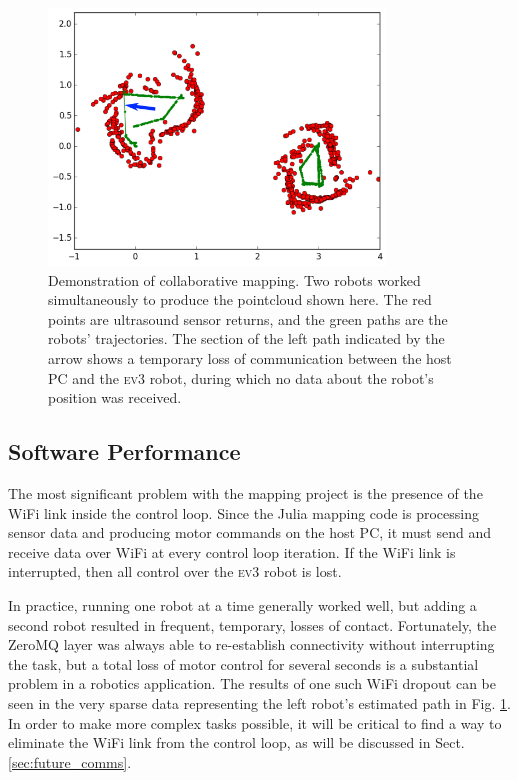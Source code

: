 \documentclass[]{article}
\newcommand{\ev}{\textsc{ev3}}
\begin{document}
\begin{figure}[htbp!]
    \centering
    \includegraphics[width=0.8\textwidth]{fig/N9_map_A_C.png}
    \caption{Demonstration of collaborative mapping. Two robots worked simultaneously to produce the pointcloud shown here. The red points are ultrasound sensor returns, and the green paths are the robots' trajectories. The section of the left path indicated by the arrow shows a temporary loss of communication between the host PC and the \ev{} robot, during which no data about the robot's position was received.}
    \label{fig:parallel_map}
\end{figure}

\subsection{Software Performance}
\label{sec:software_performance}

The most significant problem with the mapping project is the presence of the WiFi link inside the control loop. Since the Julia mapping code is processing sensor data and producing motor commands on the host PC, it must send and receive data over WiFi at every control loop iteration. If the WiFi link is interrupted, then all control over the \ev{} robot is lost. 

In practice, running one robot at a time generally worked well, but adding a second robot resulted in frequent, temporary, losses of contact. Fortunately, the ZeroMQ layer was always able to re-establish connectivity without interrupting the task, but a total loss of motor control for several seconds is a substantial problem in a robotics application. The results of one such WiFi dropout can be seen in the very sparse data representing the left robot's estimated path in Fig. \ref{fig:parallel_map}. In order to make more complex tasks possible, it will be critical to find a way to eliminate the WiFi link from the control loop, as will be discussed in Sect. \ref{sec:future_comms}. 
\end{document}
